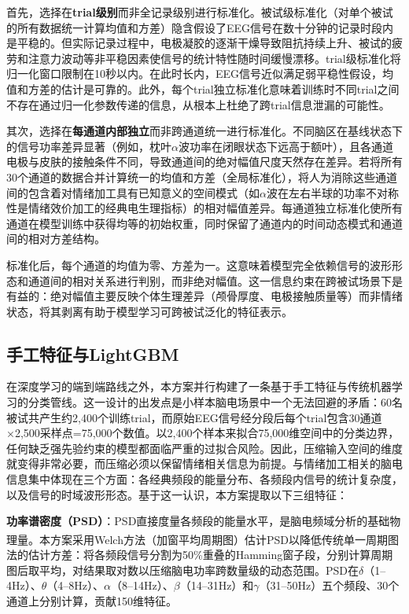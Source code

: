 \documentclass[UTF8,zihao=-4,fontset=windows]{ctexart}
\let\oldcite\cite
\renewcommand{\cite}[1]{\textsuperscript{\oldcite{#1}}}
\numberwithin{equation}{section}
\numberwithin{figure}{section}
\numberwithin{table}{section}
\begin{document}
首先，选择在\textbf{trial级别}而非全记录级别进行标准化。被试级标准化（对单个被试的所有数据统一计算均值和方差）隐含假设了EEG信号在数十分钟的记录时段内是平稳的。但实际记录过程中，电极凝胶的逐渐干燥导致阻抗持续上升、被试的疲劳和注意力波动等非平稳因素使信号的统计特性随时间缓慢漂移。trial级标准化将归一化窗口限制在10秒以内。在此时长内，EEG信号近似满足弱平稳性假设，均值和方差的估计是可靠的。此外，每个trial独立标准化意味着训练时不同trial之间不存在通过归一化参数传递的信息，从根本上杜绝了跨trial信息泄漏的可能性。

其次，选择在\textbf{每通道内部独立}而非跨通道统一进行标准化。不同脑区在基线状态下的信号功率差异显著（例如，枕叶$\alpha$波功率在闭眼状态下远高于额叶），且各通道电极与皮肤的接触条件不同，导致通道间的绝对幅值尺度天然存在差异。若将所有30个通道的数据合并计算统一的均值和方差（全局标准化），将人为消除这些通道间的包含着对情绪加工具有已知意义的空间模式（如$\alpha$波在左右半球的功率不对称性是情绪效价加工的经典电生理指标）的相对幅值差异。每通道独立标准化使所有通道在模型训练中获得均等的初始权重，同时保留了通道内的时间动态模式和通道间的相对方差结构。

标准化后，每个通道的均值为零、方差为一。这意味着模型完全依赖信号的波形形态和通道间的相对关系进行判别，而非绝对幅值。这一信息约束在跨被试场景下是有益的：绝对幅值主要反映个体生理差异（颅骨厚度、电极接触质量等）而非情绪状态，将其剥离有助于模型学习可跨被试泛化的特征表示。

\subsection{手工特征与LightGBM}

在深度学习的端到端路线之外，本方案并行构建了一条基于手工特征与传统机器学习的分类管线。这一设计的出发点是小样本脑电场景中一个无法回避的矛盾：60名被试共产生约2,400个训练trial，而原始EEG信号经分段后每个trial包含30通道×2,500采样点=75,000个数值。以2,400个样本来拟合75,000维空间中的分类边界，任何缺乏强先验约束的模型都面临严重的过拟合风险。因此，压缩输入空间的维度就变得非常必要，而压缩必须以保留情绪相关信息为前提。与情绪加工相关的脑电信息集中体现在三个方面：各经典频段的能量分布、各频段内信号的统计复杂度，以及信号的时域波形形态。基于这一认识，本方案提取以下三组特征：

\textbf{功率谱密度（PSD）}：PSD直接度量各频段的能量水平，是脑电频域分析的基础物理量。本方案采用Welch方法\cite{welch}（加窗平均周期图）估计PSD以降低传统单一周期图法的估计方差：将各频段信号分割为50\%重叠的Hamming窗子段，分别计算周期图后取平均，对结果取对数以压缩脑电功率跨数量级的动态范围。PSD在$\delta$（1--4Hz）、$\theta$（4--8Hz）、$\alpha$（8--14Hz）、$\beta$（14--31Hz）和$\gamma$（31--50Hz）五个频段、30个通道上分别计算，贡献150维特征。
\end{document}
